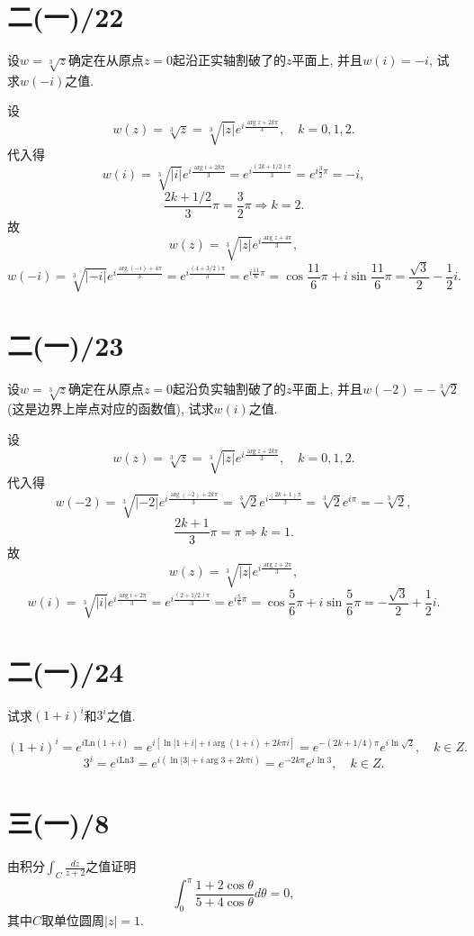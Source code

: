 \documentclass[11pt,a4paper]{article}
\begin{document}
\section{二(一)/22}
\begin{problem}
设$w=\sqrt[3]{z}$确定在从原点$z=0$起沿正实轴割破了的$z$平面上, 并且$w(i)=-i$, 试求$w(-i)$之值.
\end{problem}
设
$$w(z)=\sqrt[3]{z}=\sqrt[3]{|z|}e^{i\frac{\arg z+2k\pi}{3}},\quad k=0,1,2.$$
代入得
$$w(i)=\sqrt[3]{|i|}e^{i\frac{\arg i+2k\pi}{3}}=e^{i\frac{(2k+1/2)\pi}{3}}=e^{i\frac{3}{2}\pi}=-i,$$
$$\frac{2k+1/2}{3}\pi=\frac{3}{2}\pi\Longrightarrow k=2.$$
故
$$w(z)=\sqrt[3]{|z|}e^{i\frac{\arg z+4\pi}{3}},$$
$$w(-i)=\sqrt[3]{|-i|}e^{i\frac{\arg(-i)+4\pi}{3}}=e^{i\frac{(4+3/2)\pi}{3}}=e^{i\frac{11}{6}\pi}=\cos\frac{11}{6}\pi+i\sin\frac{11}{6}\pi=\frac{\sqrt{3}}{2}-\frac{1}{2}i.$$

\section{二(一)/23}
\begin{problem}
设$w=\sqrt[3]{z}$确定在从原点$z=0$起沿负实轴割破了的$z$平面上, 并且$w(-2)=-\sqrt[3]{2}$(这是边界上岸点对应的函数值), 试求$w(i)$之值.
\end{problem}
设
$$w(z)=\sqrt[3]{z}=\sqrt[3]{|z|}e^{i\frac{\arg z+2k\pi}{3}},\quad k=0,1,2.$$
代入得
$$w(-2)=\sqrt[3]{|-2|}e^{i\frac{\arg(-2)+2k\pi}{3}}=\sqrt[3]{2}e^{i\frac{(2k+1)\pi}{3}}=\sqrt[3]{2}e^{i\pi}=-\sqrt[3]{2},$$
$$\frac{2k+1}{3}\pi=\pi\Longrightarrow k=1.$$
故
$$w(z)=\sqrt[3]{|z|}e^{i\frac{\arg z+2\pi}{3}},$$
$$w(i)=\sqrt[3]{|i|}e^{i\frac{\arg i+2\pi}{3}}=e^{i\frac{(2+1/2)\pi}{3}}=e^{i\frac{5}{6}\pi}=\cos\frac{5}{6}\pi+i\sin\frac{5}{6}\pi=-\frac{\sqrt{3}}{2}+\frac{1}{2}i.$$

\section{二(一)/24}
\begin{problem}
试求$(1+i)^i$和$3^i$之值.
\end{problem}

$$(1+i)^i=e^{i\text{Ln}(1+i)}=e^{i[\ln|1+i|+i\arg(1+i)+2k\pi i]}=e^{-(2k+1/4)\pi}e^{i\ln\sqrt{2}},\quad k\in Z.$$
$$3^i=e^{i\text{Ln}3}=e^{i(\ln|3|+i\arg3+2k\pi i)}=e^{-2k\pi}e^{i\ln 3},\quad k\in Z.$$

\section{三(一)/8}
\begin{problem}
由积分$\displaystyle\int_C\frac{dz}{z+2}$之值证明
$$\int_0^\pi\frac{1+2\cos\theta}{5+4\cos\theta}d\theta=0,$$
其中$C$取单位圆周$|z|=1$.
\end{problem}
\end{document}
